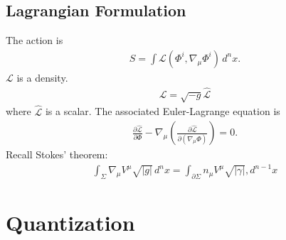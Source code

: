 \documentclass[a4paper,11pt]{article}
\numberwithin{equation}{section}
\theoremstyle{definition}
\newcommand{\p}{\partial}
\newcommand{\lag}{\mathcal{L}}
\begin{document}
\subsection{Lagrangian Formulation}
The action is
\begin{align*}
S = \int \lag (\Phi^i, \nabla_\mu \Phi^i)\,d^nx.
\end{align*}
$\lag$ is a density. 
\begin{align*}
\lag = \sqrt{-g}\hat{\lag}
\end{align*}
where $\hat{\lag}$ is a scalar. The associated Euler-Lagrange equation is
\begin{align*}
\frac{\p \hat{\lag}}{\p \Phi} - \nabla_\mu \left( \frac{\p \hat{\lag}}{\p (\nabla_\mu \Phi)}\right) = 0.
\end{align*}
Recall Stokes' theorem:
\begin{align*}
\int_\Sigma \nabla_\mu V^\mu \sqrt{\vert g\vert}\,d^nx = \int_{\p\Sigma} n_\mu V^\mu \sqrt{\vert \gamma \vert},d^{n-1}x
\end{align*}

\newpage

\section{Quantization}

\newpage
\end{document}
